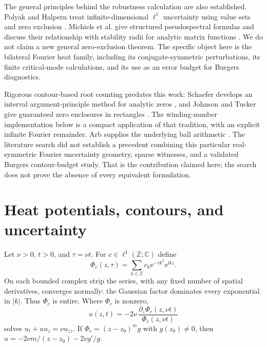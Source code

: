 \documentclass[11pt]{article}
\newcommand{\C}{\mathbb C}\newcommand{\R}{\mathbb R}\newcommand{\Z}{\mathbb Z}\newcommand{\e}{\mathrm e}\newcommand{\ii}{\mathrm i}\newcommand{\dd}{\,\mathrm d}
\begin{document}
The general principles behind the robustness calculation are also established. Polyak and Halpern treat infinite-dimensional $\ell^1$ uncertainty using value sets and zero exclusion \cite{polyak}. Michiels et al. give structured pseudospectral formulas and discuss their relationship with stability radii for analytic matrix functions \cite{michiels}. We do not claim a new general zero-exclusion theorem. The specific object here is the bilateral Fourier heat family, including its conjugate-symmetric perturbations, its finite critical-mode calculations, and its use as an error budget for Burgers diagnostics.

Rigorous contour-based root counting predates this work: Schaefer develops an interval argument-principle method for analytic zeros \cite{henrici}, and Johnson and Tucker give guaranteed zero enclosures in rectangles \cite{johnson}. The winding-number implementation below is a compact application of that tradition, with an explicit infinite Fourier remainder. Arb supplies the underlying ball arithmetic \cite{johansson}. The literature search did not establish a precedent combining this particular real-symmetric Fourier uncertainty geometry, sparse witnesses, and a validated Burgers contour-budget study. That is the contribution claimed here; the search does not prove the absence of every equivalent formulation.

\section{Heat potentials, contours, and uncertainty}
Let $\nu>0$, $t>0$, and $\tau=\nu t$. For $c\in\ell^1(\Z;\C)$ define
\begin{equation}\label{eq:heat}
 \Phi_c(z,\tau)=\sum_{k\in\Z} c_k\e^{-\tau k^2}\e^{\ii kz}.
\end{equation}
On each bounded complex strip the series, with any fixed number of spatial derivatives, converges normally: the Gaussian factor dominates every exponential in $|k|$. Thus $\Phi_c$ is entire. Where $\Phi_c$ is nonzero,
\begin{equation}\label{eq:burgers}
 u(z,t)=-2\nu\,\frac{\partial_z\Phi_c(z,\nu t)}{\Phi_c(z,\nu t)}
\end{equation}
solves $u_t+uu_z=\nu u_{zz}$. If $\Phi_c=(z-z_0)^m g$ with $g(z_0)\ne0$, then $u=-2\nu m/(z-z_0)-2\nu g'/g$.
\end{document}
